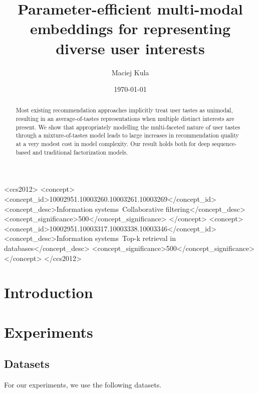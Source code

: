 \documentclass[sigchi]{acmart}
\begin{document}
\title{Parameter-efficient multi-modal embeddings for representing diverse user interests}
\author{Maciej Kula}
\date{\today}
\acmConference[]{}{}{}

\begin{CCSXML}
<ccs2012>
<concept>
<concept_id>10002951.10003260.10003261.10003269</concept_id>
<concept_desc>Information systems~Collaborative filtering</concept_desc>
<concept_significance>500</concept_significance>
</concept>
<concept>
<concept_id>10002951.10003317.10003338.10003346</concept_id>
<concept_desc>Information systems~Top-k retrieval in databases</concept_desc>
<concept_significance>500</concept_significance>
</concept>
</ccs2012>
\end{CCSXML}




\begin{abstract}
Most existing recommendation approaches implicitly treat user tastes as unimodal, resulting in an average-of-tastes representations when multiple distinct interests are present. We show that appropriately modelling the multi-faceted nature of user tastes through a mixture-of-tastes model leads to large increases in recommendation quality at a very modest cost in model complexity. Our result holds both for deep sequence-based and traditional factorization models. 
\end{abstract}

\maketitle


\section{Introduction}



\section{Experiments}
\subsection{Datasets}
For our experiments, we use the following datasets.
\end{document}
